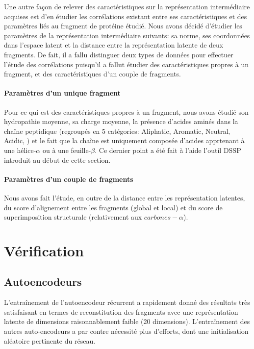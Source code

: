 \documentclass[a4paper, journal, 11pt, onecolumn]{IEEEtran}
\begin{document}
Une autre façon de relever des caractéristiques sur la représentation
intermédiaire acquises est d'en étudier les corrélations existant entre ses
caractéristiques et des paramètres liés au fragment de protéine étudié. Nous
avons décidé d'étudier les paramètres de la représentation intermédiaire
suivants: sa norme, ses coordonnées dans l'espace latent et la distance entre la
représentation latente de deux fragments. De fait, il a fallu distinguer deux
types de données pour effectuer l'étude des corrélations puisqu'il a fallut
étudier des caractéristiques propres à un fragment, et des caractéristiques
d'un couple de fragments.

\paragraph{Paramètres d'un unique fragment}

Pour ce qui est des caractéristiques propres à un fragment, nous avons étudié
son hydropathie moyenne, sa charge moyenne, la présence d'acides aminés dans la
chaîne peptidique (regroupés en 5 catégories: Aliphatic, Aromatic, Neutral,
Acidic, ) et le fait que la chaîne est uniquement composée d'acides apprtenant à
une hélice-$\alpha$ ou à une feuille-$\beta$. Ce dernier point a été fait à
l'aide l'outil DSSP introduit au début de cette section.

\paragraph{Paramètres d'un couple de fragments}

Nous avons fait l'étude, en outre de la distance entre les représentation
latentes, du score d'alignement entre les fragments (global et local) et du score de superimposition structurale (relativement
aux $carbones-\alpha$).

\section{Vérification}

\subsection{Autoencodeurs}

L'entraînement de l'autoencodeur récurrent a rapidement donné des résultats très
satisfaisant en termes de reconstitution des fragments  avec une représentation
latente de dimensions raisonnablement faible (20 dimensions). L'entraînement des
autres auto-encodeurs a par contre nécessité plus d'efforts, dont une
initialisation aléatoire pertinente du réseau.
\end{document}
